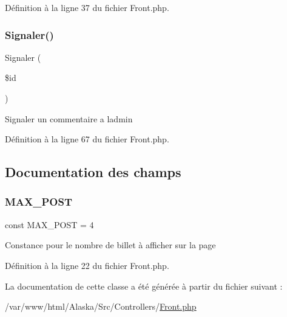 Définition à la ligne 37 du fichier Front.\+php.

\mbox{\label{class_src_1_1_controllers_1_1_front_a8b22c40bd1737bbb7db0816b7e9763b3}} 
\subsubsection{\texorpdfstring{Signaler()}{Signaler()}}
{\footnotesize\ttfamily Signaler (\begin{DoxyParamCaption}\item[{}]{\$id }\end{DoxyParamCaption})}

Signaler un commentaire a l\textquotesingle{}admin 

Définition à la ligne 67 du fichier Front.\+php.



\subsection{Documentation des champs}
\mbox{\label{class_src_1_1_controllers_1_1_front_ae6f0a6c86ad9f61cbc99ad3c4180b481}} 
\subsubsection{\texorpdfstring{M\+A\+X\+\_\+\+P\+O\+ST}{MAX\_POST}}
{\footnotesize\ttfamily const M\+A\+X\+\_\+\+P\+O\+ST = 4}

Constance pour le nombre de billet à afficher sur la page 

Définition à la ligne 22 du fichier Front.\+php.



La documentation de cette classe a été générée à partir du fichier suivant \+:\begin{DoxyCompactItemize}
\item 
/var/www/html/\+Alaska/\+Src/\+Controllers/\hyperlink{_front_8php}{Front.\+php}\end{DoxyCompactItemize}
